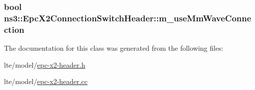 \subsubsection[{\texorpdfstring{m\+\_\+use\+Mm\+Wave\+Connection}{m_useMmWaveConnection}}]{\setlength{\rightskip}{0pt plus 5cm}bool ns3\+::\+Epc\+X2\+Connection\+Switch\+Header\+::m\+\_\+use\+Mm\+Wave\+Connection\hspace{0.3cm}{\ttfamily [private]}}\hypertarget{classns3_1_1EpcX2ConnectionSwitchHeader_a28f697d5c2cbb06c8e9b6a10ca9f808a}{}\label{classns3_1_1EpcX2ConnectionSwitchHeader_a28f697d5c2cbb06c8e9b6a10ca9f808a}


The documentation for this class was generated from the following files\+:\begin{DoxyCompactItemize}
\item 
lte/model/\hyperlink{epc-x2-header_8h}{epc-\/x2-\/header.\+h}\item 
lte/model/\hyperlink{epc-x2-header_8cc}{epc-\/x2-\/header.\+cc}\end{DoxyCompactItemize}
